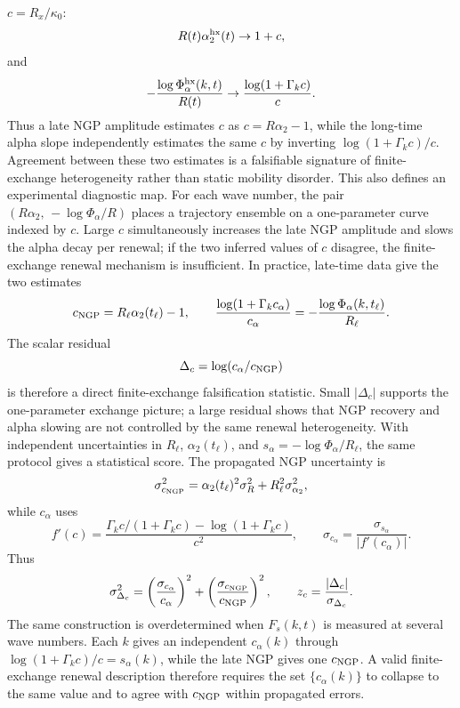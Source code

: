 \documentclass[aps,preprint,onecolumn,superscriptaddress,nofootinbib]{revtex4-2}
\begin{document}
$c=R_x/\kappa_0$:
\begin{equation}
  R(t)\alpha_2^{\rm hx}(t)\to 1+c,
\end{equation}
and
\begin{equation}
  -\frac{\log\Phi_\alpha^{\rm hx}(k,t)}{R(t)}
  \to
  \frac{\log(1+\Gamma_k c)}{c}.
\end{equation}
Thus a late NGP amplitude estimates $c$ as $c=R\alpha_2-1$, while the long-time
alpha slope independently estimates the same $c$ by inverting
$\log(1+\Gamma_kc)/c$. Agreement between these two estimates is a falsifiable
signature of finite-exchange heterogeneity rather than static mobility
disorder.
This also defines an experimental diagnostic map. For each wave number, the
pair $(R\alpha_2,\,-\log\Phi_\alpha/R)$ places a trajectory ensemble on a
one-parameter curve indexed by $c$. Large $c$ simultaneously increases the late
NGP amplitude and slows the alpha decay per renewal; if the two inferred values
of $c$ disagree, the finite-exchange renewal mechanism is insufficient.
In practice, late-time data give the two estimates
\begin{equation}
  c_{\rm NGP}=R_\ell\alpha_2(t_\ell)-1,
  \qquad
  \frac{\log(1+\Gamma_k c_\alpha)}{c_\alpha}
  =
  -\frac{\log\Phi_\alpha(k,t_\ell)}{R_\ell}.
\end{equation}
The scalar residual
\begin{equation}
  \Delta_c=\log(c_\alpha/c_{\rm NGP})
\end{equation}
is therefore a direct finite-exchange falsification statistic. Small
$|\Delta_c|$ supports the one-parameter exchange picture; a large residual
shows that NGP recovery and alpha slowing are not controlled by the same renewal
heterogeneity.
With independent uncertainties in $R_\ell$, $\alpha_2(t_\ell)$, and
$s_\alpha=-\log\Phi_\alpha/R_\ell$, the same protocol gives a statistical
score. The propagated NGP uncertainty is
\begin{equation}
  \sigma_{c_{\rm NGP}}^2
  =
  \alpha_2(t_\ell)^2\sigma_R^2+R_\ell^2\sigma_{\alpha_2}^2,
\end{equation}
while $c_\alpha$ uses
\begin{equation}
  f'(c)=
  \frac{\Gamma_k c/(1+\Gamma_kc)-\log(1+\Gamma_kc)}{c^2},
  \qquad
  \sigma_{c_\alpha}=\frac{\sigma_{s_\alpha}}{|f'(c_\alpha)|}.
\end{equation}
Thus
\begin{equation}
  \sigma_{\Delta_c}^2=
  \left(\frac{\sigma_{c_\alpha}}{c_\alpha}\right)^2+
  \left(\frac{\sigma_{c_{\rm NGP}}}{c_{\rm NGP}}\right)^2,\qquad
  z_c=\frac{|\Delta_c|}{\sigma_{\Delta_c}}.
\end{equation}
The same construction is overdetermined when $F_s(k,t)$ is measured at several
wave numbers. Each $k$ gives an independent $c_\alpha(k)$ through
$\log(1+\Gamma_k c)/c=s_\alpha(k)$, while the late NGP gives one
$c_{\rm NGP}$. A valid finite-exchange renewal description therefore requires
the set $\{c_\alpha(k)\}$ to collapse to the same value and to agree with
$c_{\rm NGP}$ within propagated errors.
\end{document}
